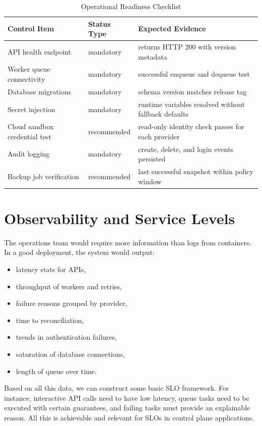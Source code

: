 \begin{table}[H]
\centering
\caption{Operational Readiness Checklist}
\label{tab:ops_readiness}
\begin{tabular}{|p{4.2cm}|p{2.2cm}|p{5.0cm}|}
\hline
\textbf{Control Item} & \textbf{Status Type} & \textbf{Expected Evidence} \\ \hline
API health endpoint & mandatory & returns HTTP 200 with version metadata \\ \hline
Worker queue connectivity & mandatory & successful enqueue and dequeue test \\ \hline
Database migrations & mandatory & schema version matches release tag \\ \hline
Secret injection & mandatory & runtime variables resolved without fallback defaults \\ \hline
Cloud sandbox credential test & recommended & read-only identity check passes for each provider \\ \hline
Audit logging & mandatory & create, delete, and login events persisted \\ \hline
Backup job verification & recommended & last successful snapshot within policy window \\ \hline
\end{tabular}
\end{table}

\section{Observability and Service Levels}
The operations team would require more information than logs from containers. In a good deployment, the system would output:
 

\begin{itemize}
    \item latency stats for APIs,
    \item throughput of workers and retries,
    \item failure reasons grouped by provider,
    \item time to reconciliation,
    \item trends in authentication failures,
    \item saturation of database connections,
    \item length of queue over time.
\end{itemize}

Based on all this data, we can construct some basic SLO framework. For instance, interactive API calls need to have low latency, queue tasks need to be executed with certain guarantees, and failing tasks must provide an explainable reason. All this is achievable and relevant for SLOs in control plane applications.

